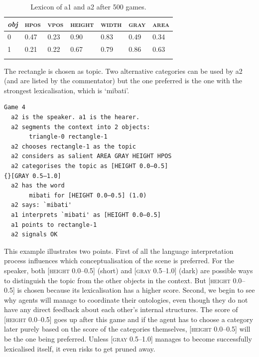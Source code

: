 \begin{table}
\begin{center}
\begin{tabular}{ l  l  l  l  l  l  l }
\lsptoprule
{\itshape obj} & \textsc{hpos} & \textsc{vpos} & \textsc{height} & \textsc{width} & \textsc{gray} & \textsc{area} \\ \midrule
0 & 0.47 & 0.23 & 0.90 & 0.83 & 0.49 & 0.34\\ 
1 & 0.21 & 0.22 & 0.67 & 0.79 & 0.86 & 0.63\\ 
\lspbottomrule
\end{tabular}
\caption{\label{tab:mibati}Lexicon of a1 and a2 after 500 games.}
\end{center}
\end{table}
The rectangle is chosen as topic. Two alternative
categories can be used by {\bfshape  a2} (and are listed
by the commentator) but the one preferred
is the one with the strongest lexicalisation, which is 
`mibati'.
\begin{verbatim}
Game 4
  a2 is the speaker. a1 is the hearer. 
  a2 segments the context into 2 objects: 
       triangle-0 rectangle-1
  a2 chooses rectangle-1 as the topic 
  a2 considers as salient AREA GRAY HEIGHT HPOS
  a2 categorises the topic as [HEIGHT 0.0–0.5] 
{}[GRAY 0.5–1.0]
  a2 has the word
       mibati for [HEIGHT 0.0–0.5] (1.0)
  a2 says: `mibati'
  a1 interprets `mibati' as [HEIGHT 0.0–0.5]
  a1 points to rectangle-1
  a2 signals OK 
\end{verbatim}

This example illustrates two points. First of all the 
language interpretation process influences 
which conceptualisation of the scene is preferred. For 
the speaker, both [\textsc{height} 0.0–0.5] (short) and [\textsc{gray} 0.5–1.0]
(dark) are possible ways to distinguish the topic from the 
other objects in the context. But [\textsc{height} 0.0–0.5] is 
chosen because its lexicalisation has a higher score. 
Second, we begin to see why agents will manage to 
coordinate their ontologies, even though they do not 
have any direct feedback about each other's internal 
structures. The score of [\textsc{height} 0.0–0.5] goes up after
this game and if the 
agent has to choose a category later purely based on 
the score of the categories themselves, [\textsc{height} 0.0–0.5] will 
be the one being preferred. Unless [\textsc{gray} 0.5–1.0] manages
to become successfully lexicalised itself, it even risks to 
get pruned away. 


